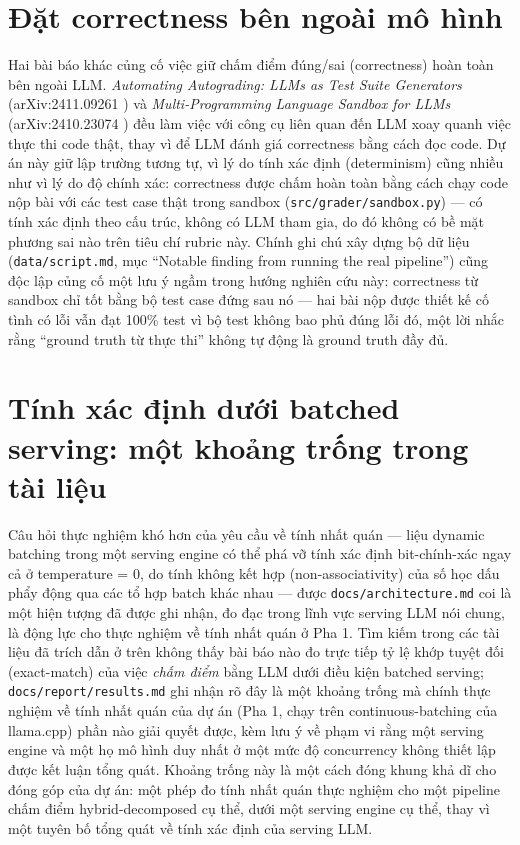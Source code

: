 \documentclass[a4paper,12pt]{report}
\begin{document}
\section{Đặt correctness bên ngoài mô hình}

Hai bài báo khác củng cố việc giữ chấm điểm đúng/sai (correctness) hoàn
toàn bên ngoài LLM. \textit{Automating Autograding: LLMs as Test Suite
Generators} (arXiv:2411.09261 \cite{autograding_test_suites}) và
\textit{Multi-Programming Language Sandbox for LLMs} (arXiv:2410.23074
\cite{multi_lang_sandbox}) đều làm việc với công cụ liên quan đến LLM xoay
quanh việc thực thi code thật, thay vì để LLM đánh giá correctness bằng
cách đọc code. Dự án này giữ lập trường tương tự, vì lý do tính xác định
(determinism) cũng nhiều như vì lý do độ chính xác: correctness được chấm
hoàn toàn bằng cách chạy code nộp bài với các test case thật trong sandbox
(\texttt{src/grader/sandbox.py}) — có tính xác định theo cấu trúc, không
có LLM tham gia, do đó không có bề mặt phương sai nào trên tiêu chí rubric
này. Chính ghi chú xây dựng bộ dữ liệu (\texttt{data/script.md}, mục
``Notable finding from running the real pipeline'') cũng độc lập củng cố
một lưu ý ngầm trong hướng nghiên cứu này: correctness từ sandbox chỉ tốt
bằng bộ test case đứng sau nó — hai bài nộp được thiết kế cố tình có lỗi
vẫn đạt 100\% test vì bộ test không bao phủ đúng lỗi đó, một lời nhắc rằng
``ground truth từ thực thi'' không tự động là ground truth đầy đủ.

\section{Tính xác định dưới batched serving: một khoảng trống trong tài liệu}
\label{sec:determinism-gap}

Câu hỏi thực nghiệm khó hơn của yêu cầu về tính nhất quán — liệu dynamic
batching trong một serving engine có thể phá vỡ tính xác định bit-chính-xác
ngay cả ở temperature = 0, do tính không kết hợp (non-associativity) của
số học dấu phẩy động qua các tổ hợp batch khác nhau — được
\texttt{docs/architecture.md} coi là một hiện tượng đã được ghi nhận, đo
đạc trong lĩnh vực serving LLM nói chung, là động lực cho thực nghiệm về
tính nhất quán ở Pha 1. Tìm kiếm trong các tài liệu đã trích dẫn ở trên
không thấy bài báo nào đo trực tiếp tỷ lệ khớp tuyệt đối (exact-match) của
việc \emph{chấm điểm} bằng LLM dưới điều kiện batched serving;
\texttt{docs/report/results.md} ghi nhận rõ đây là một khoảng trống mà
chính thực nghiệm về tính nhất quán của dự án (Pha 1, chạy trên
continuous-batching của llama.cpp) phần nào giải quyết được, kèm lưu ý về
phạm vi rằng một serving engine và một họ mô hình duy nhất ở một mức độ
concurrency không thiết lập được kết luận tổng quát. Khoảng trống này là
một cách đóng khung khả dĩ cho đóng góp của dự án: một phép đo tính nhất
quán thực nghiệm cho một pipeline chấm điểm hybrid-decomposed cụ thể, dưới
một serving engine cụ thể, thay vì một tuyên bố tổng quát về tính xác định
của serving LLM.
\end{document}
